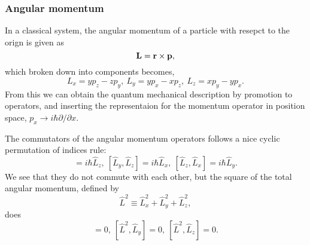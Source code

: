     \subsubsection{Angular momentum}
    In a classical system, the angular momentum of a particle with 
    resepct to the orign is given as
    \begin{equation}
        \vb{L} = \vb{r} \times \vb{p},
    \end{equation}
    which broken down into components becomes,
    \begin{equation}
        L_x = y p_z - z p_y,\ 
        L_y = y p_x - x p_z,\ 
        L_z = x p_y - y p_x.
    \end{equation}
    From this we can obtain the quantum mechanical description by promotion to operators,
    and inserting the representaion for the momentum operator in position space,
    $p_x \to i\hbar \partial / \partial x$.

    The commutators of the angular momentum operators follows a nice cyclic permutation 
    of indices rule:
    \begin{equation}
        [\hat{L}_x, \hat{L}_y] = i\hbar \hat{L}_z, \  
        [\hat{L}_y, \hat{L}_z] = i\hbar \hat{L}_x, \ 
        [\hat{L}_z, \hat{L}_x] = i\hbar \hat{L}_y.
    \end{equation}
    We see that they do not commute with each other, but the square of the total 
    angular momentum, defined by 
    \begin{equation}
        \hat{L}^2 \equiv \hat{L}_x^2 + \hat{L}_y^2 + \hat{L}_z^2,
    \end{equation}
    does
    \begin{equation}
        [\hat{L}^2, \hat{L}_x] = 0, \ 
        [\hat{L}^2, \hat{L}_y] = 0, \ 
        [\hat{L}^2, \hat{L}_z] = 0.
    \end{equation}

